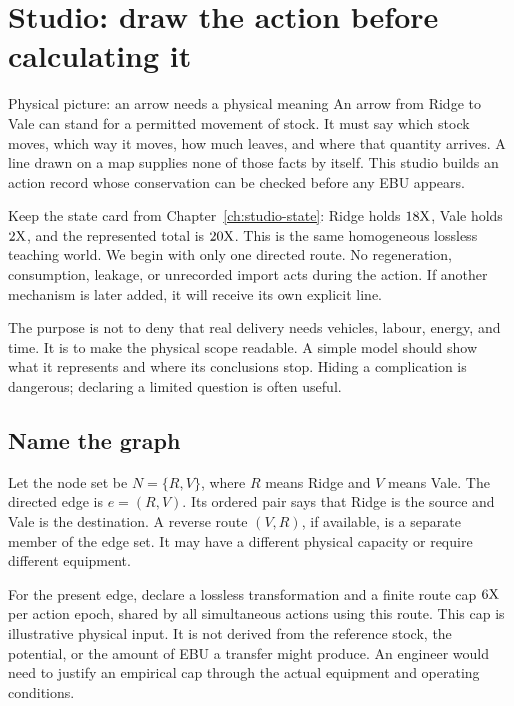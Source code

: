 \chapter{Studio: draw the action before calculating it}\label{ch:studio-action}

\begin{intuitionbox}{Physical picture: an arrow needs a physical meaning}
An arrow from Ridge to Vale can stand for a permitted movement of stock. It must say which stock moves, which way it moves, how much leaves, and where that quantity arrives. A line drawn on a map supplies none of those facts by itself. This studio builds an action record whose conservation can be checked before any EBU appears.
\end{intuitionbox}

Keep the state card from Chapter~\ref{ch:studio-state}: Ridge holds \(18\mathrm{X}\), Vale holds \(2\mathrm{X}\), and the represented total is \(20\mathrm{X}\). This is the same homogeneous lossless teaching world. We begin with only one directed route. No regeneration, consumption, leakage, or unrecorded import acts during the action. If another mechanism is later added, it will receive its own explicit line.

The purpose is not to deny that real delivery needs vehicles, labour, energy, and time. It is to make the physical scope readable. A simple model should show what it represents and where its conclusions stop. Hiding a complication is dangerous; declaring a limited question is often useful.

\section{Name the graph}

Let the node set be \(N=\{R,V\}\), where \(R\) means Ridge and \(V\) means Vale. The directed edge is \(e=(R,V)\). Its ordered pair says that Ridge is the source and Vale is the destination. A reverse route \((V,R)\), if available, is a separate member of the edge set. It may have a different physical capacity or require different equipment.

For the present edge, declare a lossless transformation and a finite route cap \(6\mathrm{X}\) per action epoch, shared by all simultaneous actions using this route. This cap is illustrative physical input. It is not derived from the reference stock, the potential, or the amount of EBU a transfer might produce. An engineer would need to justify an empirical cap through the actual equipment and operating conditions.

